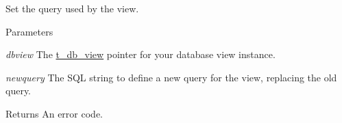 Set the query used by the view. 
\begin{DoxyParams}{Parameters}
\item[{\em dbview}]The \hyperlink{group__database_gac9ea40a519578e26498dd61ea98b5cf2}{t\_\-db\_\-view} pointer for your database view instance. \item[{\em newquery}]The SQL string to define a new query for the view, replacing the old query. \end{DoxyParams}
\begin{DoxyReturn}{Returns}
An error code. 
\end{DoxyReturn}
